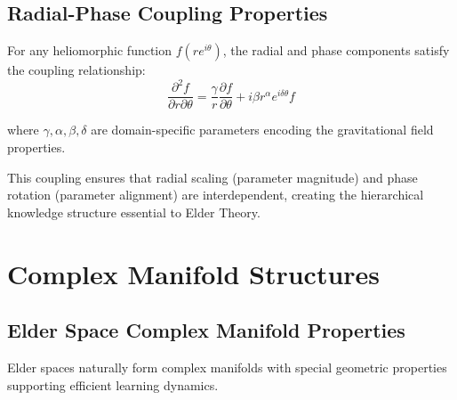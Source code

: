 \subsection{Radial-Phase Coupling Properties}

\begin{theorem}
\label{thm:heliomorphic_coupling}
For any heliomorphic function $f(re^{i\theta})$, the radial and phase components satisfy the coupling relationship:
\begin{equation}
\frac{\partial^2 f}{\partial r \partial \theta} = \frac{\gamma}{r} \frac{\partial f}{\partial \theta} + i\beta r^{\alpha} e^{i\delta\theta} f
\end{equation}

where $\gamma, \alpha, \beta, \delta$ are domain-specific parameters encoding the gravitational field properties.

This coupling ensures that radial scaling (parameter magnitude) and phase rotation (parameter alignment) are interdependent, creating the hierarchical knowledge structure essential to Elder Theory.
\end{theorem}

\section{Complex Manifold Structures}

\subsection{Elder Space Complex Manifold Properties}

Elder spaces naturally form complex manifolds with special geometric properties supporting efficient learning dynamics.

